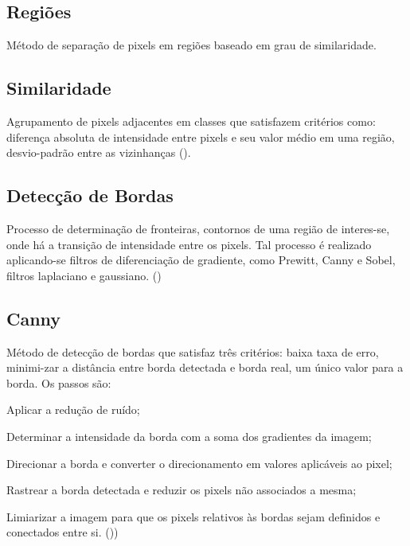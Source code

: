 \documentclass[12pt,oneside,a4paper,chapter=TITLE,section=TITLE,sumario=tradicional]{abntex2}
\begin{document}
\subsection{Regiões}
Método de separação de pixels em regiões baseado em grau de similaridade.

\subsection{Similaridade}
Agrupamento de pixels adjacentes em classes que satisfazem critérios como: diferença absoluta de intensidade entre pixels e seu valor médio em uma região, desvio-padrão entre as vizinhanças ().

\subsection{Detecção de Bordas}
Processo de determinação de fronteiras, contornos de uma região de interes-se, onde há a transição de intensidade entre os pixels. Tal processo é realizado aplicando-se filtros de diferenciação de gradiente, como Prewitt, Canny e Sobel, filtros laplaciano e gaussiano. ()

\subsection{Canny}
Método de detecção de bordas que satisfaz três critérios: baixa taxa de erro, minimi-zar a distância entre borda detectada e borda real, um único valor para a borda. Os passos são:
\begin{lista}
    \item Aplicar a redução de ruído;
    \item Determinar a intensidade da borda com a soma dos gradientes da imagem;
    \item Direcionar a borda e converter o direcionamento em valores aplicáveis ao pixel;
    \item Rastrear a borda detectada e reduzir os pixels não associados a mesma;
    \item Limiarizar a imagem para que os pixels relativos às bordas sejam definidos e conectados entre si. ())
\end{lista}
\end{document}
